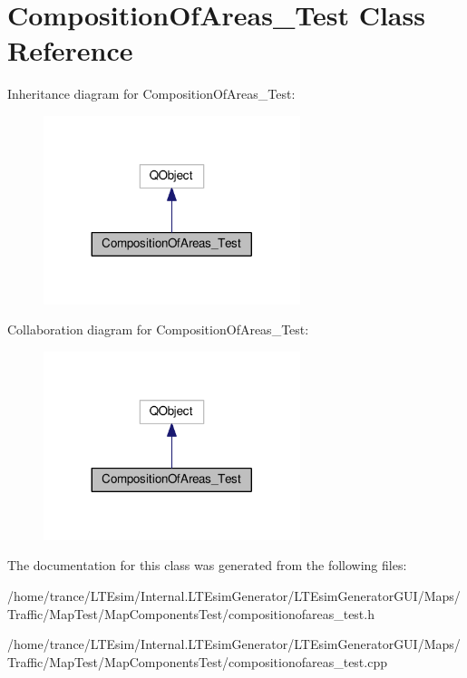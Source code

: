 \hypertarget{class_composition_of_areas___test}{}\section{Composition\+Of\+Areas\+\_\+\+Test Class Reference}
\label{class_composition_of_areas___test}


Inheritance diagram for Composition\+Of\+Areas\+\_\+\+Test\+:
\nopagebreak
\begin{figure}[H]
\begin{center}
\leavevmode
\includegraphics[width=212pt]{class_composition_of_areas___test__inherit__graph}
\end{center}
\end{figure}


Collaboration diagram for Composition\+Of\+Areas\+\_\+\+Test\+:
\nopagebreak
\begin{figure}[H]
\begin{center}
\leavevmode
\includegraphics[width=212pt]{class_composition_of_areas___test__coll__graph}
\end{center}
\end{figure}


The documentation for this class was generated from the following files\+:\begin{DoxyCompactItemize}
\item 
/home/trance/\+L\+T\+Esim/\+Internal.\+L\+T\+Esim\+Generator/\+L\+T\+Esim\+Generator\+G\+U\+I/\+Maps/\+Traffic/\+Map\+Test/\+Map\+Components\+Test/compositionofareas\+\_\+test.\+h\item 
/home/trance/\+L\+T\+Esim/\+Internal.\+L\+T\+Esim\+Generator/\+L\+T\+Esim\+Generator\+G\+U\+I/\+Maps/\+Traffic/\+Map\+Test/\+Map\+Components\+Test/compositionofareas\+\_\+test.\+cpp\end{DoxyCompactItemize}
